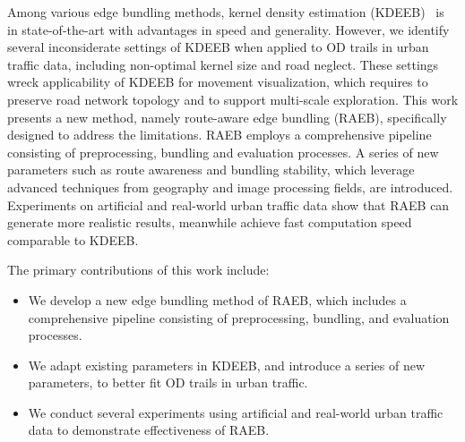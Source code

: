 Among various edge bundling methods, kernel density estimation (KDEEB)~\cite{hurter2012graph} is in state-of-the-art with advantages in speed and generality.
However, we identify several inconsiderate settings of KDEEB when applied to OD trails in urban traffic data, including non-optimal kernel size and road neglect.
These settings wreck applicability of KDEEB for movement visualization, which requires to preserve road network topology and to support multi-scale exploration.
This work presents a new method, namely route-aware edge bundling (RAEB), specifically designed to address the limitations.
RAEB employs a comprehensive pipeline consisting of preprocessing, bundling and evaluation processes.
A series of new parameters such as route awareness and bundling stability, which leverage advanced techniques from geography and image processing fields, are introduced.
Experiments on artificial and real-world urban traffic data show that RAEB can generate more realistic results, meanwhile achieve fast computation speed comparable to KDEEB.

\vspace{1.5mm}
The primary contributions of this work include:

\begin{itemize}

\item
We develop a new edge bundling method of RAEB, which includes a comprehensive pipeline consisting of preprocessing, bundling, and evaluation processes. 

\item
We adapt existing parameters in KDEEB, and introduce a series of new parameters, to better fit OD trails in urban traffic.

\item
We conduct several experiments using artificial and real-world urban traffic data to demonstrate effectiveness of RAEB. 
\end{itemize}